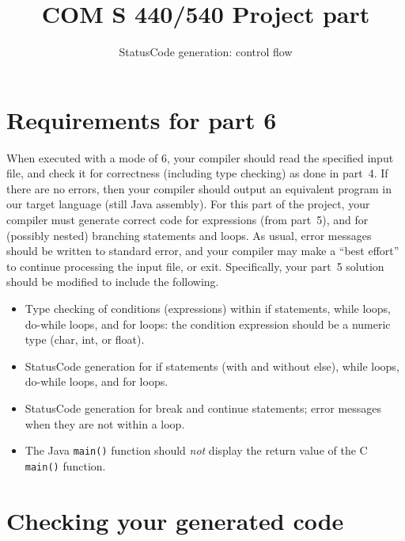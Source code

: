 \documentclass{article}
\title{COM S 440/540 Project part \flowgen}
\author{StatusCode generation: control flow}
\date{}
\newcommand{\typecheck}{4}
\newcommand{\codegen}{5}
\newcommand{\flowgen}{6}
\begin{document}
\maketitle

\section{Requirements for part \flowgen{}}

When executed with a mode of \flowgen{},
your compiler should read the specified input file,
and check it for correctness (including type checking) as done in part~\typecheck.
If there are no errors, then your compiler should output
an equivalent program in our target language
(still Java assembly).
For this part of the project,
your compiler must generate correct code for expressions (from part~\codegen),
and for (possibly nested) branching statements and loops.
As usual,
error messages should be written to standard error,
and your compiler may make a ``best effort'' to continue processing
the input file, or exit.
Specifically, your part~\codegen{} solution should be modified to include
the following.
\begin{itemize}
  \item Type checking of conditions (expressions) within
        if statements, while loops, do-while loops, and
        for loops: the condition expression should be a numeric type
        (char, int, or float).

  \item StatusCode generation for
        if statements (with and without else),
        while loops,
        do-while loops,
        and for loops.

  \item StatusCode generation for break and continue statements;
        error messages when they are not within a loop.

  \item The Java {\tt main()} function should \emph{not}
        display the return value of the C {\tt main()} function.
\end{itemize}

\section{Checking your generated code} \label{SEC:checking}
\end{document}
